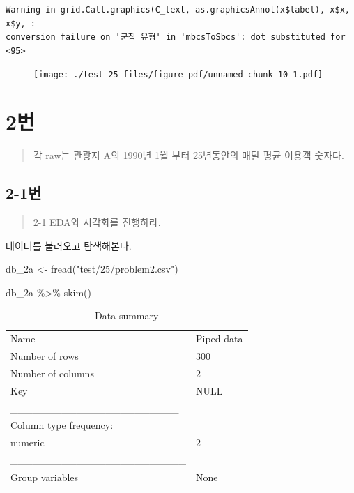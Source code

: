 \documentclass[
  letterpaper,
  DIV=11,
  numbers=noendperiod]{scrreprt}
\newenvironment{Shaded}{\begin{snugshade}}{\end{snugshade}}
\newcommand{\FunctionTok}[1]{\textcolor[rgb]{0.28,0.35,0.67}{#1}}
\newcommand{\NormalTok}[1]{\textcolor[rgb]{0.00,0.23,0.31}{#1}}
\newcommand{\OtherTok}[1]{\textcolor[rgb]{0.00,0.23,0.31}{#1}}
\newcommand{\SpecialCharTok}[1]{\textcolor[rgb]{0.37,0.37,0.37}{#1}}
\newcommand{\StringTok}[1]{\textcolor[rgb]{0.13,0.47,0.30}{#1}}
\begin{document}
\begin{verbatim}
Warning in grid.Call.graphics(C_text, as.graphicsAnnot(x$label), x$x, x$y, :
conversion failure on '군집 유형' in 'mbcsToSbcs': dot substituted for <95>
\end{verbatim}

\begin{figure}[H]

{\centering \texttt{[image: ./test\_25\_files/figure-pdf/unnamed-chunk-10-1.pdf]}

}

\end{figure}

\hypertarget{uxbc88-43}{%
\chapter*{2번}\label{uxbc88-43}}


\begin{quote}
각 raw는 관광지 A의 1990년 1월 부터 25년동안의 매달 평균 이용객 숫자다.
\end{quote}

\hypertarget{uxbc88-44}{%
\section*{2-1번}\label{uxbc88-44}}


\begin{quote}
2-1 EDA와 시각화를 진행하라.
\end{quote}

데이터를 불러오고 탐색해본다.

\begin{Shaded}
\begin{Highlighting}[]
\NormalTok{db\_2a }\OtherTok{\textless{}{-}} \FunctionTok{fread}\NormalTok{(}\StringTok{"test/25/problem2.csv"}\NormalTok{)}

\NormalTok{db\_2a }\SpecialCharTok{\%\textgreater{}\%} \FunctionTok{skim}\NormalTok{()}
\end{Highlighting}
\end{Shaded}

\begin{longtable}[]{@{}ll@{}}
\caption{Data summary}\tabularnewline
\toprule()
\endhead
Name & Piped data \\
Number of rows & 300 \\
Number of columns & 2 \\
Key & NULL \\
\_\_\_\_\_\_\_\_\_\_\_\_\_\_\_\_\_\_\_\_\_\_\_ & \\
Column type frequency: & \\
numeric & 2 \\
\_\_\_\_\_\_\_\_\_\_\_\_\_\_\_\_\_\_\_\_\_\_\_\_ & \\
Group variables & None \\
\bottomrule()
\end{longtable}
\end{document}
